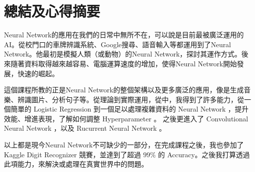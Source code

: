 \chapter*{總結及心得摘要}  

Neural Network的應用在我們的日常中無所不在，可以說是目前最被廣泛運用的AI。從校門口的車牌辨識系統、Google搜尋、語音輸入等都運用到了Neural Network。他最初是模擬人類（或動物）的Neural Network，探討其運作方式。後來隨著資料取得越來越容易、電腦運算速度的增加，使得Neural Network開始發展，快速的崛起。

這個課程所教的正是Neural Network的整個架構以及更多廣泛的應用，像是生成音樂、辨識圖片、分析句子等。從理論到實際運用，從中，我得到了許多能力，從一個簡單的 Logistic Regression 到一個足以處理複雜資料的 Neural Network ，提升效能、增進表現，了解如何調整 Hyperparameter 。 之後更進入了 Convolutional Neural Network ，以及 Rucurrent Neural Network 。

以上都是現今Neural Network不可缺少的一部分，在完成課程之後，我也參加了 Kaggle Digit Recognizer 競賽，並達到了超過 $ 99\% $ 的 Accuracy。之後我打算透過此項能力，來解決或處理在真實世界中的問題。